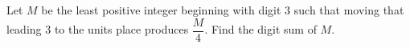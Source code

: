 Let $M$ be the least positive integer beginning with digit $3$ such that moving that leading $3$ to the units place produces $\dfrac{M}{4}$. Find the digit sum of $M$.
